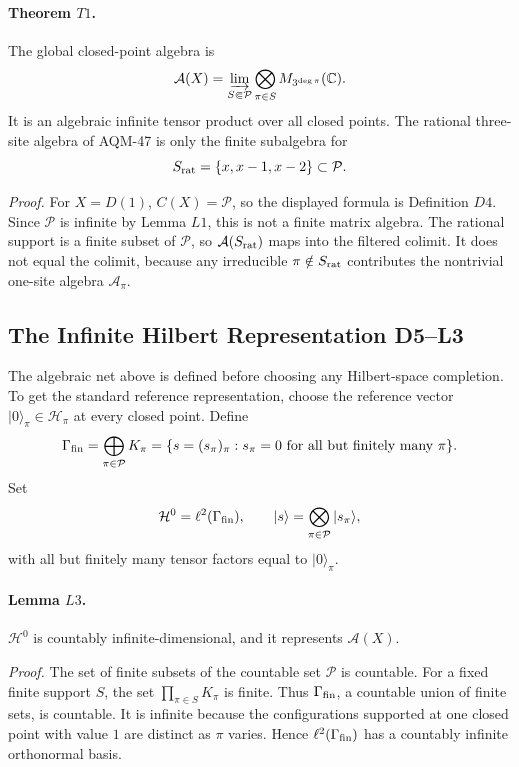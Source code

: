 \paragraph{Theorem \(T1\).}
The global closed-point algebra is
\[
  \mathcal A(X)=
  \varinjlim_{S\Subset\mathcal P}
  \bigotimes_{\pi\in S}M_{3^{\deg\pi}}(\mathbb C).
\]
It is an algebraic infinite tensor product over all closed points.  The
rational three-site algebra of AQM-47 is only the finite subalgebra for
\[
  S_{\rm rat}=\{x,x-1,x-2\}\subset\mathcal P.
\]

\emph{Proof.}
For \(X=D(1)\), \(C(X)=\mathcal P\), so the displayed formula is Definition
\(D4\).  Since \(\mathcal P\) is infinite by Lemma \(L1\), this is not a finite
matrix algebra.  The rational support is a finite subset of \(\mathcal P\), so
\(\mathcal A(S_{\rm rat})\) maps into the filtered colimit.  It does not equal
the colimit, because any irreducible \(\pi\notin S_{\rm rat}\) contributes the
nontrivial one-site algebra \(\mathcal A_\pi\).

\subsection{The Infinite Hilbert Representation D5--L3}
The algebraic net above is defined before choosing any Hilbert-space
completion.  To get the standard reference representation, choose the reference
vector \(|0\rangle_\pi\in\mathcal H_\pi\) at every closed point.  Define
\[
  \Gamma_{\rm fin}
  =
  \bigoplus_{\pi\in\mathcal P}K_\pi
  =
  \{s=(s_\pi)_\pi:s_\pi=0\text{ for all but finitely many }\pi\}.
\]
Set
\[
  \mathcal H^0=\ell^2(\Gamma_{\rm fin}),\qquad
  |s\rangle=\bigotimes_{\pi\in\mathcal P}|s_\pi\rangle,
\]
with all but finitely many tensor factors equal to \(|0\rangle_\pi\).

\paragraph{Lemma \(L3\).}
\(\mathcal H^0\) is countably infinite-dimensional, and it represents
\(\mathcal A(X)\).

\emph{Proof.}
The set of finite subsets of the countable set \(\mathcal P\) is countable.
For a fixed finite support \(S\), the set \(\prod_{\pi\in S}K_\pi\) is finite.
Thus \(\Gamma_{\rm fin}\), a countable union of finite sets, is countable.
It is infinite because the configurations supported at one closed point with
value \(1\) are distinct as \(\pi\) varies.  Hence
\(\ell^2(\Gamma_{\rm fin})\) has a countably infinite orthonormal basis.

